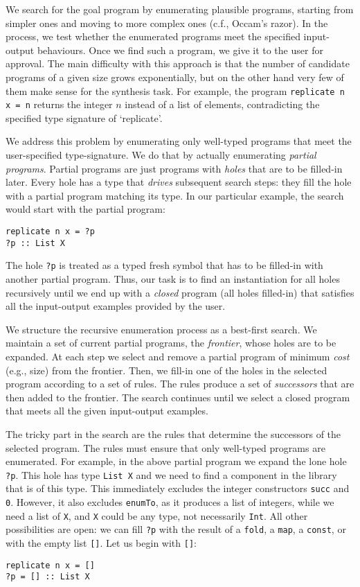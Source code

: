 We search for the goal program by enumerating plausible programs, starting from simpler ones and moving to more complex ones (c.f., Occam's razor).  In the process, we test whether the enumerated programs meet the specified input-output behaviours.  Once we find such a program, we give it to the user for approval.  The main difficulty with this approach is that the number of candidate programs of a given size grows exponentially, but on the other hand very few of them make sense for the synthesis task.  For example, the program \lstinline|replicate n x = n| returns the integer $n$ instead of a list of elements, contradicting the specified type signature of `replicate'.

We address this problem by enumerating only well-typed programs that meet the user-specified type-signature.  We do that by actually enumerating \emph{partial programs}.  Partial programs are just programs with \emph{holes} that are to be filled-in later.  Every hole has a type that \emph{drives} subsequent search steps: they fill the hole with a partial program matching its type.  In our particular example, the search would start with the partial program:
\begin{lstlisting}[style=plain]
replicate n x = ?p
?p :: List X
\end{lstlisting}
The hole \lstinline|?p| is treated as a typed fresh symbol that has to be filled-in with another partial program.  Thus, our task is to find an instantiation for all holes recursively until we end up with a \emph{closed} program (all holes filled-in) that satisfies all the input-output examples provided by the user.

We structure the recursive enumeration process as a best-first search.  We maintain a set of current partial programs, the \emph{frontier}, whose holes are to be expanded.  At each step we select and remove a partial program of minimum \emph{cost} (e.g., size) from the frontier.  Then, we fill-in one of the holes in the selected program according to a set of rules.  The rules produce a set of \emph{successors} that are then added to the frontier.  The search continues until we select a closed program that meets all the given input-output examples.

The tricky part in the search are the rules that determine the successors of the selected program.  The rules must ensure that only well-typed programs are enumerated.  For example, in the above partial program we expand the lone hole \lstinline|?p|.  This hole has type \lstinline|List X| and we need to find a component in the library that is of this type.  This immediately excludes the integer constructors \lstinline|succ| and \lstinline|0|.  However, it also excludes \lstinline|enumTo|, as it produces a list of integers, while we need a list of \lstinline|X|, and \lstinline|X| could be any type, not necessarily \lstinline|Int|.  All other possibilities are open: we can fill \lstinline|?p| with the result of a \lstinline|fold|, a \lstinline|map|, a \lstinline|const|, or with the empty list \lstinline|[]|.  Let us begin with \lstinline|[]|:
\begin{lstlisting}[style=plain]
replicate n x = []
?p = [] :: List X
\end{lstlisting}

